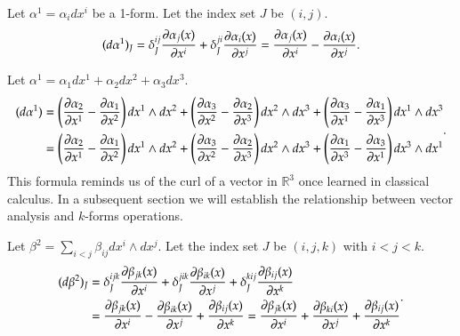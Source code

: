 \documentclass[11pt, a4paper]{book}
\begin{document}
\begin{Example}
  Let $\alpha^1 = \alpha_i dx^i$ be a 1-form. Let the index set $J$ be $(i,j)$.
  \begin{equation}
    \label{eq:exterior-diff-1-form}
    (d\alpha^1)_{J} = \delta_{J}^{ij} \frac{\partial \alpha_j(x)}{\partial x^i} +
    \delta_{J}^{ji} \frac{\partial \alpha_i(x)}{\partial x^j} = \frac{\partial
      \alpha_j(x)}{\partial x^i} - \frac{\partial \alpha_i(x)}{\partial x^j}.
  \end{equation}
\end{Example}

\begin{Example}
  Let $\alpha^1 = \alpha_1dx^1 + \alpha_2dx^2 + \alpha_3dx^3$.
  \begin{equation}
    \label{eq:exterior-diff-1-form-3d}
    \begin{aligned}
      (d\alpha^1) &= \left( \frac{\partial \alpha_2}{\partial x^1} - \frac{\partial
          \alpha_1}{\partial x^2} \right) dx^1 \wedge dx^2 + \left( \frac{\partial
          \alpha_3}{\partial x^2} - \frac{\partial \alpha_2}{\partial x^3} \right) dx^2 \wedge
      dx^3 + \left( \frac{\partial \alpha_3}{\partial x^1} - \frac{\partial \alpha_1}{\partial x^3}
      \right) dx^1 \wedge dx^3 \\
      &= \left( \frac{\partial \alpha_2}{\partial x^1} - \frac{\partial
          \alpha_1}{\partial x^2} \right) dx^1 \wedge dx^2 + \left( \frac{\partial
          \alpha_3}{\partial x^2} - \frac{\partial \alpha_2}{\partial x^3} \right) dx^2 \wedge
      dx^3 + \left( \frac{\partial \alpha_1}{\partial x^3} - \frac{\partial \alpha_3}{\partial x^1}
      \right) dx^3 \wedge dx^1
    \end{aligned}.
  \end{equation}
  This formula reminds us of the curl of a vector in $\mathbb{R}^3$ once learned in
  classical calculus. In a subsequent section we will establish the relationship between
  vector analysis and $k$-forms operations.
\end{Example}

\begin{Example}
  Let $\beta^2 = \sum_{i < j} \beta_{ij} dx^i \wedge dx^j$. Let the index set $J$ be
  $(i,j,k)$ with $i < j < k$.
  \begin{equation}
    \label{eq:exterior-diff-2-form}
    \begin{aligned}
      (d\beta^2)_{J} &= \delta_J^{ijk} \frac{\partial \beta_{jk}(x)}{\partial x^i} +
      \delta_J^{jik} \frac{\partial \beta_{ik}(x)}{\partial x^j} + \delta_J^{kij} \frac{\partial
        \beta_{ij}(x)}{\partial x^k} \\
      &= \frac{\partial \beta_{jk}(x)}{\partial x^i} - \frac{\partial \beta_{ik}(x)}{\partial x^j}
      + \frac{\partial \beta_{ij}(x)}{\partial x^k} = \frac{\partial \beta_{jk}(x)}{\partial x^i}
      + \frac{\partial \beta_{ki}(x)}{\partial x^j} + \frac{\partial \beta_{ij}(x)}{\partial x^k}
    \end{aligned}.
  \end{equation}
\end{Example}
\end{document}

